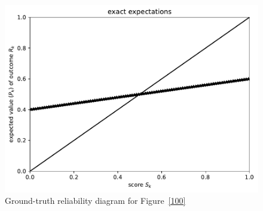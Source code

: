 \documentclass{article}
\begin{document}
\begin{figure}
\begin{centering}

\parbox{\imsize}{\includegraphics[width=\imsize]
                {./codes/unweighted/100_4_0_0/exact.pdf}}

\end{centering}
\caption{Ground-truth reliability diagram for Figure~\ref{100}}
\label{100e}
\end{figure}
\end{document}
